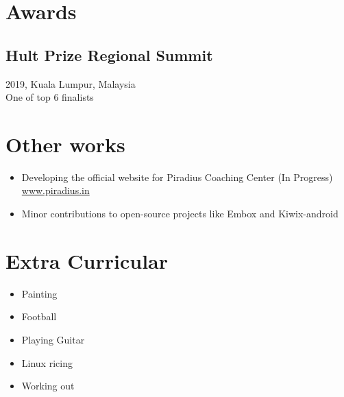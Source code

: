 \documentclass{article}
\begin{document}
\section{Awards}
\subsection{Hult Prize Regional Summit}
2019, Kuala Lumpur, Malaysia\\
One of top 6 finalists


\section{Other works} 
\begin{itemize}
	\item Developing the official website for Piradius Coaching Center (In Progress)\\
	\href{https:\\www.piradius.in}{www.piradius.in}
	\item Minor contributions to open-source projects like Embox and Kiwix-android
\end{itemize}


\section{Extra Curricular}
\begin{itemize}
	\item Painting
	\item Football
	\item Playing Guitar
	\item Linux ricing
	\item Working out
\end{itemize}
\end{document}
